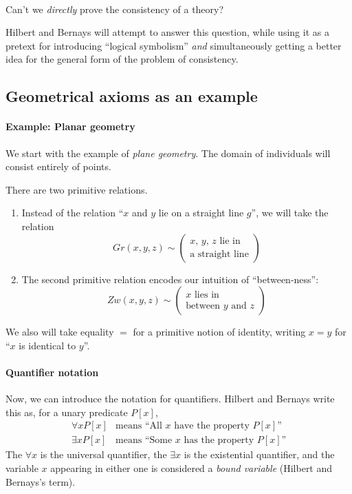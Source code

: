 \paragraph{}
Can't we \emph{directly} prove the consistency of a theory?

Hilbert and Bernays will attempt to answer this question, while using
it as a pretext for introducing ``logical symbolism'' \emph{and}
simultaneously getting a better idea for the general form of the
problem of consistency.

\subsection{Geometrical axioms as an example}

\paragraph{Example: Planar geometry}
We start with the example of \emph{plane geometry}.
The domain of individuals will consist entirely of points.

There are two primitive relations.
\begin{enumerate}
\item Instead of the relation ``$x$ and $y$ lie on a straight line $g$'', we
will take the relation
\begin{equation*}
  Gr(x,y,z)\sim%
\begin{pmatrix}
  \mbox{$x$, $y$, $z$ lie in}\\
  \mbox{a straight line}
\end{pmatrix}
\end{equation*}
\item The second primitive relation encodes our intuition of
``between-ness'':
\begin{equation*}
Zw(x,y,z)\sim%
\begin{pmatrix}
  \mbox{$x$ lies in}\\
  \mbox{between $y$ and $z$}
\end{pmatrix}
\end{equation*}
\end{enumerate}
We also will take equality $=$ for a primitive notion of identity,
writing $x=y$ for ``$x$ is identical to $y$''.

\paragraph{Quantifier notation}
Now, we can introduce the notation for quantifiers. Hilbert and
Bernays write this as, for a unary predicate $P[x]$,
\begin{equation*}
  \begin{array}{rl}
\forall{x}{P[x]}&\mbox{means ``All $x$ have the property $P[x]$''}\\
\exists{x}{P[x]}&\mbox{means ``Some $x$ has the property $P[x]$''}
  \end{array}
\end{equation*}
The $\forall{x}$ is the universal quantifier, the $\exists{x}$ is the
existential quantifier, and the variable $x$ appearing in either one
is considered a \emph{bound variable} (Hilbert and Bernays's term).

